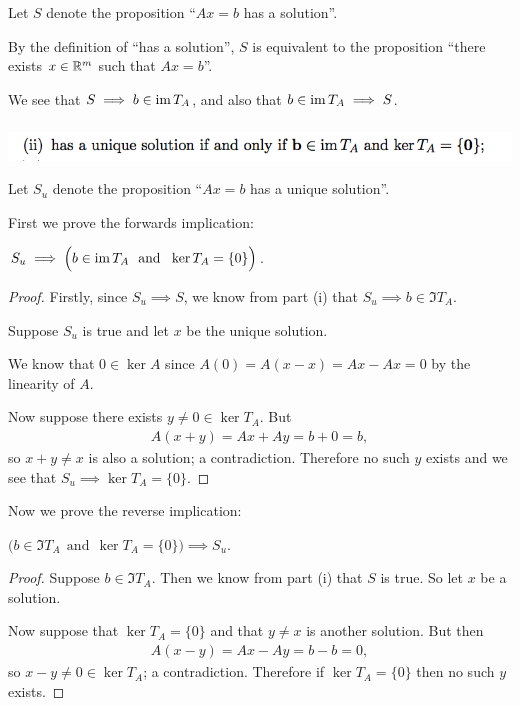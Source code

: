 \documentclass[12pt]{article}
\begin{document}
Let $S$ denote the proposition ``$Ax = b$ has a solution''.

By the definition of ``has a solution'', $S$ is equivalent to the proposition
``there exists $x \in \mathbb{R}^m$ such that $Ax = b$''.

We see that $S \implies b \in \operatorname{\text{im}} T_A$, and also that $b \in \operatorname{\text{im}} T_A \implies S$.

\subsubsection*{} %
\begin{mdframed}
\includegraphics[width=400pt]{img/oxford-prelims-2017-A-2-1-2.png}
\end{mdframed}

Let $S_u$ denote the proposition ``$Ax = b$ has a unique solution''.

First we prove the forwards implication:

\begin{claim*}
  $S_u \implies \Big(b \in \operatorname{\text{im}} T_A ~~\text{and}~~ \ker T_A = \{0\}\Big)$.
\end{claim*}

\begin{proof}
Firstly, since $S_u \implies S$, we know from part (i) that
$S_u \implies b \in \Im T_A$.

Suppose $S_u$ is true and let $x$ be the unique solution.

We know that $0 \in \ker A$ since $A(0) = A(x - x) = Ax - Ax = 0$ by the
linearity of $A$.

Now suppose there exists $y \neq 0 \in \ker T_A$. But
\begin{align*}
A(x + y) = Ax + Ay = b + 0 = b,
\end{align*}
so $x + y \neq x$ is also a solution; a contradiction. Therefore no such $y$
exists and we see that $S_u \implies \ker T_A = \{0\}$.
\end{proof}

Now we prove the reverse implication:

\begin{claim*}
  $\Big(b \in \Im T_A ~~\text{and}~~ \ker T_A = \{0\}\Big) \implies S_u$.
\end{claim*}

\begin{proof}
  Suppose $b \in \Im T_A$. Then we know from part (i) that $S$ is true. So let
  $x$ be a solution.

Now suppose that $\ker T_A = \{0\}$ and that $y \neq x$ is another solution. But then
\begin{align*}
  A(x - y) = Ax - Ay = b - b = 0,
\end{align*}
so $x - y \neq 0 \in \ker T_A$; a contradiction. Therefore if $\ker T_A = \{0\}$
then no such $y$ exists.
\end{proof}
\end{document}
